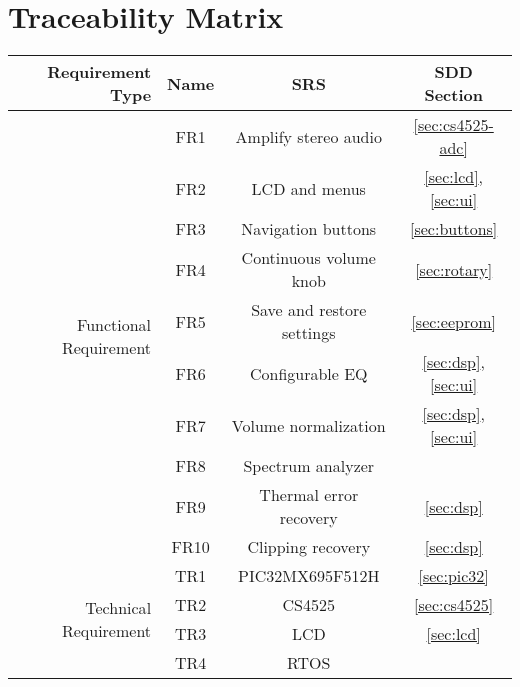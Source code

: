 \section{Traceability Matrix}
\begin{center}
\begin{tabular}{| r | c | c | c |}
\hline
\textbf{Requirement Type} & \textbf{Name} &  \textbf{SRS} & \textbf{SDD Section} \\
\hline
\multirow{10}{*}{Functional Requirement} & FR1 & Amplify stereo audio & \ref{sec:cs4525-adc} \\
 & FR2 & LCD and menus & \ref{sec:lcd},\ref{sec:ui} \\
 & FR3 & Navigation buttons & \ref{sec:buttons} \\
 & FR4 & Continuous volume knob & \ref{sec:rotary} \\
 & FR5 & Save and restore settings & \ref{sec:eeprom} \\
 & FR6 & Configurable EQ & \ref{sec:dsp}, \ref{sec:ui} \\
 & FR7 & Volume normalization & \ref{sec:dsp}, \ref{sec:ui}\\
 & FR8 & Spectrum analyzer & \\
 & FR9 & Thermal error recovery & \ref{sec:dsp}\\
 & FR10 & Clipping recovery & \ref{sec:dsp} \\
\hline
\multirow{4}{*}{Technical Requirement} & TR1 & PIC32MX695F512H & \ref{sec:pic32} \\
 & TR2 & CS4525 & \ref{sec:cs4525} \\
 & TR3 & LCD & \ref{sec:lcd} \\
 & TR4 & RTOS & \\
\hline
\end{tabular}
\end{center}

